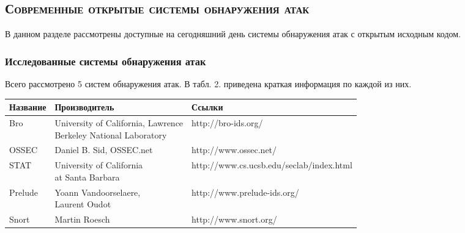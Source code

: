 \subsection{\textsc{Современные открытые системы обнаружения атак}}

В данном разделе рассмотрены доступные на сегодняшний день системы
обнаружения атак с открытым исходным кодом.

\subsubsection{Исследованные системы обнаружения атак}

Всего рассмотрено 5 систем обнаружения атак. В табл. 2. приведена краткая информация по каждой из них.

\begin{center}
\begin{tabular}{ | l | l | l | }

\hline
Название & Производитель & Ссылки \\ \hline
Bro & \specialcell{University of California, Lawrence\\Berkeley National Laboratory} & http://bro-ids.org/ \\ \hline
OSSEC & Daniel B. Sid, OSSEC.net & http://www.ossec.net/ \\ \hline
STAT & \specialcell{University of California\\at Santa Barbara} & http://www.cs.ucsb.edu/seclab/index.html \\ \hline
Prelude & \specialcell{Yoann Vandoorselaere,\\Laurent Oudot} & http://www.prelude-ids.org/ \\ \hline
Snort & Martin Roesch & http://www.snort.org/ \\ \hline

\end{tabular}
\end{center}